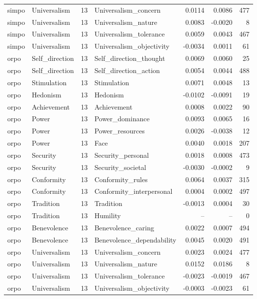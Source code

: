 \begin{tabular}{llrlrrr}
simpo & Universalism & 13 & Universalism\_concern & 0.0114 & 0.0086 & 477 \\
simpo & Universalism & 13 & Universalism\_nature & 0.0083 & -0.0020 & 8 \\
simpo & Universalism & 13 & Universalism\_tolerance & 0.0059 & 0.0043 & 467 \\
simpo & Universalism & 13 & Universalism\_objectivity & -0.0034 & 0.0011 & 61 \\
orpo & Self\_direction & 13 & Self\_direction\_thought & 0.0069 & 0.0060 & 25 \\
orpo & Self\_direction & 13 & Self\_direction\_action & 0.0054 & 0.0044 & 488 \\
orpo & Stimulation & 13 & Stimulation & 0.0071 & 0.0048 & 13 \\
orpo & Hedonism & 13 & Hedonism & -0.0102 & -0.0091 & 19 \\
orpo & Achievement & 13 & Achievement & 0.0008 & 0.0022 & 90 \\
orpo & Power & 13 & Power\_dominance & 0.0093 & 0.0065 & 16 \\
orpo & Power & 13 & Power\_resources & 0.0026 & -0.0038 & 12 \\
orpo & Power & 13 & Face & 0.0040 & 0.0018 & 207 \\
orpo & Security & 13 & Security\_personal & 0.0018 & 0.0008 & 473 \\
orpo & Security & 13 & Security\_societal & -0.0030 & -0.0002 & 9 \\
orpo & Conformity & 13 & Conformity\_rules & 0.0064 & 0.0037 & 315 \\
orpo & Conformity & 13 & Conformity\_interpersonal & 0.0004 & 0.0002 & 497 \\
orpo & Tradition & 13 & Tradition & -0.0013 & 0.0004 & 30 \\
orpo & Tradition & 13 & Humility & -- & -- & 0 \\
orpo & Benevolence & 13 & Benevolence\_caring & 0.0022 & 0.0007 & 494 \\
orpo & Benevolence & 13 & Benevolence\_dependability & 0.0045 & 0.0020 & 491 \\
orpo & Universalism & 13 & Universalism\_concern & 0.0023 & 0.0024 & 477 \\
orpo & Universalism & 13 & Universalism\_nature & 0.0152 & 0.0186 & 8 \\
orpo & Universalism & 13 & Universalism\_tolerance & -0.0023 & -0.0019 & 467 \\
orpo & Universalism & 13 & Universalism\_objectivity & -0.0003 & -0.0023 & 61 \\

\end{tabular}
